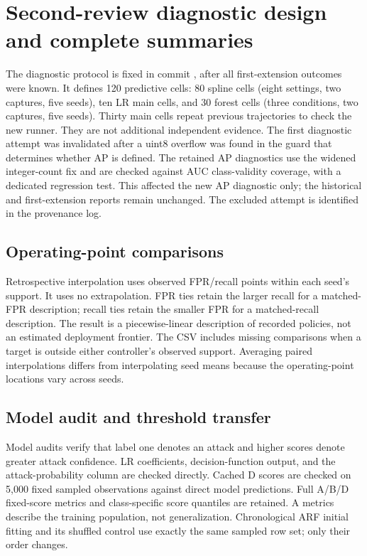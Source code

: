 \section{Second-review diagnostic design and complete summaries}
\label{sec:review2}
The diagnostic protocol is fixed in commit , after all first-extension outcomes were known. It defines 120 predictive cells: 80 spline cells (eight settings, two captures, five seeds), ten LR main cells, and 30 forest cells (three conditions, two captures, five seeds). Thirty main cells repeat previous trajectories to check the new runner. They are not additional independent evidence. The first diagnostic attempt was invalidated after a uint8 overflow was found in the guard that determines whether AP is defined. The retained AP diagnostics use the widened integer-count fix and are checked against AUC class-validity coverage, with a dedicated regression test. This affected the new AP diagnostic only; the historical and first-extension reports remain unchanged. The excluded attempt is identified in the provenance log.

\subsection{Operating-point comparisons}
Retrospective interpolation uses observed FPR/recall points within each seed's support. It uses no extrapolation. FPR ties retain the larger recall for a matched-FPR description; recall ties retain the smaller FPR for a matched-recall description. The result is a piecewise-linear description of recorded policies, not an estimated deployment frontier. The CSV includes missing comparisons when a target is outside either controller's observed support. Averaging paired interpolations differs from interpolating seed means because the operating-point locations vary across seeds.



\subsection{Model audit and threshold transfer}
Model audits verify that label one denotes an attack and higher scores denote greater attack confidence. LR coefficients, decision-function output, and the attack-probability column are checked directly. Cached D scores are checked on 5,000 fixed sampled observations against direct model predictions. Full A/B/D fixed-score metrics and class-specific score quantiles are retained. A metrics describe the training population, not generalization. Chronological ARF initial fitting and its shuffled control use exactly the same sampled row set; only their order changes.


